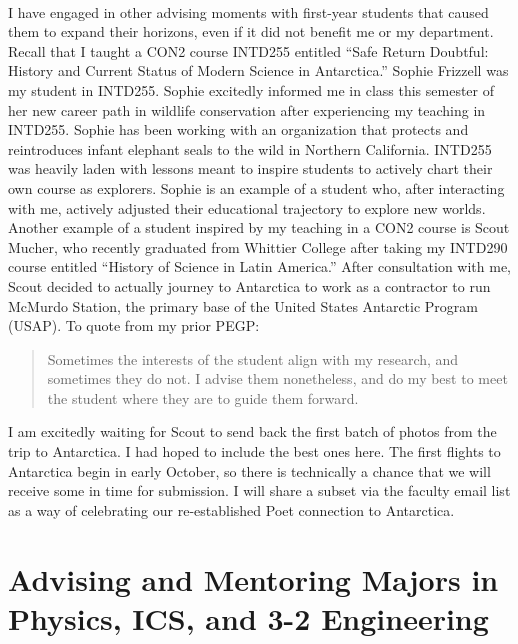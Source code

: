 \documentclass[../../main.tex]{subfiles}
\begin{document}
\\
\vspace{0.15cm}
I have engaged in other advising moments with first-year students that caused them to expand their horizons, even if it did not benefit me or my department.  Recall that I taught a CON2 course INTD255 entitled ``Safe Return Doubtful: History and Current Status of Modern Science in Antarctica.''  Sophie Frizzell was my student in INTD255.  Sophie excitedly informed me in class this semester of her new career path in wildlife conservation after experiencing my teaching in INTD255.  Sophie has been working with an organization that protects and reintroduces infant elephant seals to the wild in Northern California.  INTD255 was heavily laden with lessons meant to inspire students to actively chart their own course as explorers.  Sophie is an example of a student who, after interacting with me, actively adjusted their educational trajectory to explore new worlds.  Another example of a student inspired by my teaching in a CON2 course is Scout Mucher, who recently graduated from Whittier College after taking my INTD290 course entitled ``History of Science in Latin America.''  After consultation with me, Scout decided to actually journey to Antarctica to work as a contractor to run McMurdo Station, the primary base of the United States Antarctic Program (USAP).  To quote from my prior PEGP:

\begin{quotation}
Sometimes the interests of the student align with my research, and sometimes they do not. I advise them nonetheless, and do my best to meet the student where they are to guide them forward.
\end{quotation}

I am excitedly waiting for Scout to send back the first batch of photos from the trip to Antarctica.  I had hoped to include the best ones here.  The first flights to Antarctica begin in early October, so there is technically a chance that we will receive some in time for submission.  I will share a subset via the faculty email list as a way of celebrating our re-established Poet connection to Antarctica.

\section{Advising and Mentoring Majors in Physics, ICS, and 3-2 Engineering}
\end{document}
